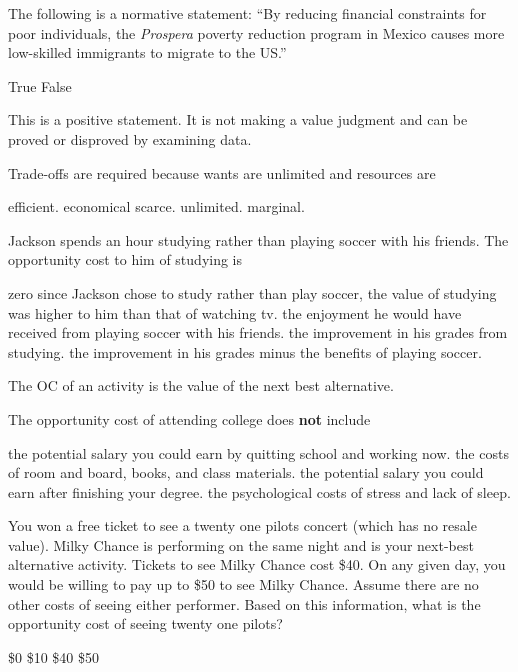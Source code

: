\documentclass[addpoints,11pt]{exam}
\theoremstyle{definition}
\begin{document}
\begin{questions}
	\question The following is a normative statement: ``By reducing financial constraints for poor individuals, the \textit{Prospera} poverty reduction program in Mexico causes more low-skilled immigrants to migrate to the US.''
	
		\begin{choices}
			\choice True
			\CorrectChoice False
		\end{choices} 
		
		
		\begin{solution}
			This is a positive statement. It is not making a value judgment and can be proved or disproved by examining data.
		\end{solution}
		
	\question Trade-offs are required because wants are unlimited and resources are 
	
	\begin{choices}
		\choice efficient.
		\choice economical
		\CorrectChoice scarce.
		\choice unlimited.
		\choice marginal.
	\end{choices}
		
	\question Jackson spends an hour studying rather than playing soccer with his friends. The opportunity cost to him of studying is
	\begin{choices}
		\choice zero since Jackson chose to study rather than play soccer, the value of studying was higher to him than that of watching tv.
		\CorrectChoice the enjoyment he would have received from playing soccer with his friends.
		\choice the improvement in his grades from studying.
		\choice the improvement in his grades minus the benefits of playing soccer.
	\end{choices}
	
	\begin{solution}
		The OC of an activity is the value of the next best alternative.
	\end{solution}
	
	\question The opportunity cost of attending college does \textbf{not} include
	
	\begin{choices}
		\choice the potential salary you could earn by quitting school and working now.
		\choice the costs of room and board, books, and class materials.
		\CorrectChoice the potential salary you could earn after finishing your degree.
		\choice the psychological costs of stress and lack of sleep.
	\end{choices}
	
\question You won a free ticket to see a twenty one pilots concert (which has no resale value). Milky Chance is performing on the same night and is your next-best alternative activity. Tickets to see Milky Chance cost \$40. On any given day, you would be willing to pay up to \$50 to see Milky Chance. Assume there are no other costs of seeing either performer. Based on this information, what is the opportunity cost of seeing twenty one pilots?
	\begin{choices}
		\choice \$0
		\CorrectChoice \$10
		\choice \$40
		\choice \$50
	\end{choices}
	

\end{questions}
\end{document}
